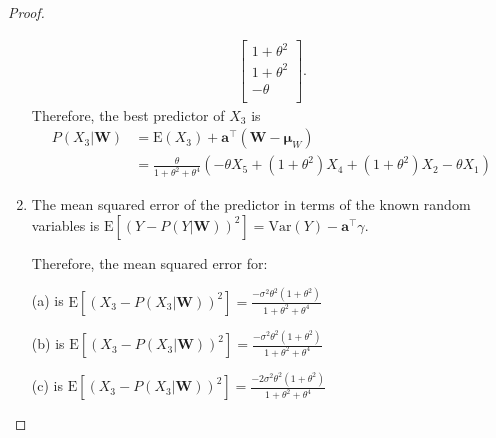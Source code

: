 \documentclass[12pt]{article}
\theoremstyle{definition}
\newcommand{\E}{\text{E}}
\newcommand{\V}{\text{Var}}
\newcommand{\vect}[1]{\boldsymbol{#1}}
\begin{document}
\begin{proof}
\begin{enumerate}
\begin{align*}
\begin{bmatrix}
          1 + \theta^2 \\
          1 + \theta^2 \\
          -\theta \\
        \end{bmatrix}.
      \end{align*}
      Therefore, the best predictor of $X_3$ is
      \begin{align*}
        P(X_3|\vect{W}) &= \E(X_3) + \vect{a}^\intercal (\vect{W} - \vect{\mu}_W) \\
        &= \frac{\theta}{1 + \theta^2 + \theta^4} (- \theta  X_5 + (1 + \theta^2) X_4 + (1 + \theta^2) X_2 -\theta X_1)
      \end{align*}

    \item The mean squared error of the predictor in terms of the known random
      variables is $\E\left[ (Y - P(Y|\vect{W}))^2 \right] = \V(Y) - \vect{a}^\intercal \gamma$.

      Therefore, the mean squared error for:

      (a) is $\E\left[ (X_3 - P(X_3|\vect{W}))^2 \right] =
      \frac{-\sigma^2\theta^2(1 + \theta^2)}{1 + \theta^2 + \theta^4}$

      (b) is $\E\left[ (X_3 - P(X_3|\vect{W}))^2 \right] =
      \frac{-\sigma^2\theta^2(1 + \theta^2)}{1 + \theta^2 + \theta^4}$

      (c) is $\E\left[ (X_3 - P(X_3|\vect{W}))^2 \right] =
      \frac{-2\sigma^2\theta^2(1 + \theta^2)}{1 + \theta^2 + \theta^4}$
  \end{enumerate}
\end{proof}
\end{document}
